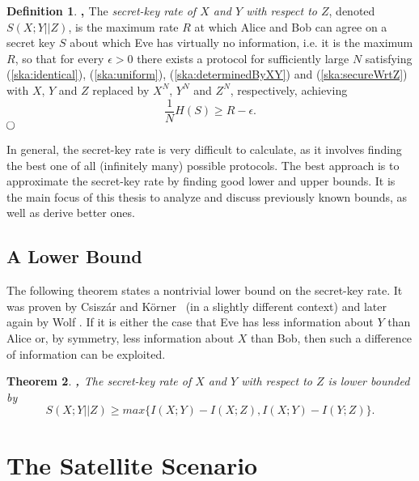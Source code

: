 \documentclass[a4paper, twoside, openany]{report}
\newcommand{\srate}{S(X;Y||Z)}
\newcommand{\eps}{\epsilon}
\theoremstyle{plain}
\newtheorem{theorem}{Theorem}
\theoremstyle{definition}
\newtheorem{definition}[theorem]{Definition}
\newcommand{\textcirc}{%
  \setlength{\unitlength}{1.5ex}%
  \begin{picture}(1.1,1)(-.55,-.55)%
    \put(0,0){\circle{1.1}}%
  \end{picture}}
\newcommand{\definitionend}{\hspace*{\fill} $\textcirc$}
\begin{document}
\begin{definition} {\bf \cite{ka}, \cite{diss}}
{\rm
The {\it secret-key rate of $X$ and $Y$ with respect to $Z$}, denoted $\srate$, is the maximum rate $R$ at which Alice and Bob can agree on a secret key $S$ about which Eve has virtually no information, i.e. it is the maximum $R$, so that for every $\eps > 0$ there exists a protocol for sufficiently large $N$ satisfying (\ref{ska:identical}), (\ref{ska:uniform}), (\ref{ska:determinedByXY}) and (\ref{ska:secureWrtZ}) with $X$, $Y$ and $Z$ replaced by $X^N$, $Y^N$ and $Z^N$, respectively, achieving
\begin{equation} \label{ska:rate}
\frac{1}{N}H(S) \geq R-\eps.
\end{equation}
}
\definitionend
\end{definition}

In general, the secret-key rate is very difficult to calculate, as it involves finding the best one of all (infinitely many) possible protocols. The best approach is to approximate the secret-key rate by finding good lower and upper bounds. It is the main focus of this thesis to analyze and discuss previously known bounds, as well as derive better ones.


\subsection{A Lower Bound}

The following theorem states a nontrivial lower bound on the secret-key rate. It was proven by Csisz\'ar and K\"orner~\cite{csikor78} (in a slightly different context) and later again by Wolf \cite{diss}. If it is either the case that Eve has less information about $Y$ than Alice or, by symmetry, less information about $X$ than Bob, then such a difference of information can be exploited.

\begin{theorem} \label{lowerBound} {\bf \cite{csikor78}, \cite{diss}}
The secret-key rate of $X$ and $Y$ with respect to $Z$ is lower bounded by
\[\srate \geq max\{I(X;Y) - I(X;Z), I(X;Y) - I(Y;Z)\}.\]
\end{theorem}


\section{The Satellite Scenario}
\end{document}
